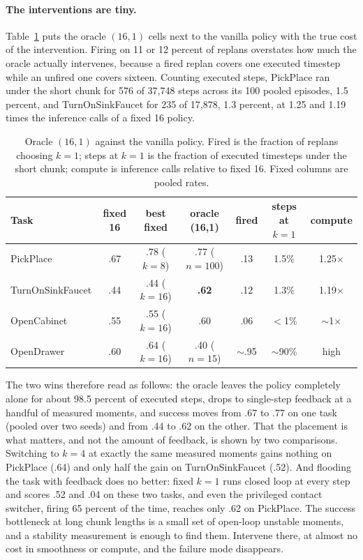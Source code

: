 \documentclass[11pt]{article}
\begin{document}
\paragraph{The interventions are tiny.}
Table~\ref{tab:tiny} puts the oracle $(16,1)$ cells next to the vanilla
policy with the true cost of the intervention. Firing on 11 or 12 percent
of replans overstates how much the oracle actually intervenes, because a
fired replan covers one executed timestep while an unfired one covers
sixteen. Counting executed steps, PickPlace ran under the short chunk for
576 of 37{,}748 steps across its 100 pooled episodes, 1.5 percent, and
TurnOnSinkFaucet for 235 of 17{,}878, 1.3 percent, at 1.25 and 1.19 times
the inference calls of a fixed 16 policy.

\begin{table}[h]
\centering
\small
\begin{tabular}{lcccccc}
\toprule
Task & fixed 16 & best fixed & oracle (16,1) & fired & steps at $k{=}1$ & compute \\
\midrule
PickPlace        & .67 & .78 ($k{=}8$)  & .77 ($n{=}100$) & .13 & 1.5\% & 1.25$\times$ \\
TurnOnSinkFaucet & .44 & .44 ($k{=}16$) & \textbf{.62} & .12 & 1.3\% & 1.19$\times$ \\
OpenCabinet      & .55 & .55 ($k{=}16$) & .60 & .06 & $<$1\% & $\sim$1$\times$ \\
OpenDrawer       & .60 & .64 ($k{=}16$) & .40 ($n{=}15$) & $\sim$.95 & $\sim$90\% & high \\
\bottomrule
\end{tabular}
\caption{Oracle $(16,1)$ against the vanilla policy. Fired is the fraction
of replans choosing $k{=}1$; steps at $k{=}1$ is the fraction of executed
timesteps under the short chunk; compute is inference calls relative to
fixed 16. Fixed columns are pooled rates.}
\label{tab:tiny}
\end{table}

The two wins therefore read as follows: the oracle leaves the policy
completely alone for about 98.5 percent of executed steps, drops to
single-step feedback at a handful of measured moments, and success moves
from .67 to .77 on one task (pooled over two seeds) and from .44 to .62 on
the other. That the placement is what matters, and not the amount of
feedback, is shown by two comparisons. Switching to $k{=}4$ at exactly the
same measured moments gains nothing on PickPlace (.64) and only half the
gain on TurnOnSinkFaucet (.52). And flooding the task with feedback does
no better: fixed $k{=}1$ runs closed loop at every step and scores .52 and
.04 on these two tasks, and even the privileged contact switcher, firing
65 percent of the time, reaches only .62 on PickPlace. The success
bottleneck at long chunk lengths is a small set of open-loop unstable
moments, and a stability measurement is enough to find them. Intervene
there, at almost no cost in smoothness or compute, and the failure mode
disappears.
\end{document}

